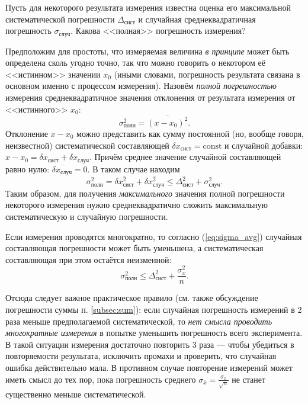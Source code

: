 \documentclass[10pt]{article}
\begin{document}
Пусть для некоторого результата измерения известна оценка его максимальной
систематической погрешности $\Delta_{\text{сист}}$ и случайная среднеквадратичная
погрешность $\sigma_{\text{случ}}$. Какова <<полная>>
погрешность измерения?

Предположим для простоты, что измеряемая величина \emph{в принципе}
может быть определена сколь угодно точно, так что можно говорить о
некотором её <<истинном>> значении $x_{0}$
(иными словами, погрешность результата связана в основном именно с
процессом измерения). Назовём \emph{полной погрешностью} измерения
среднеквадратичное значения отклонения от результата измерения от
<<истинного>> $x_{0}$: 
\[
\sigma_{\text{полн}}^{2}=\overline{\left(x-x_{0}\right)^{2}}.
\]
Отклонение $x-x_{0}$ можно представить как сумму постоянной (но,
вообще говоря, неизвестной) систематической составляющей $\delta x_{\text{сист}}=\mathrm{const}$
и случайной добавки: $x-x_{0}=\delta x_{\text{сист}}+\delta x_{\text{случ}}$.
Причём среднее значение случайной составляющей равно нулю: $\overline{\delta x_{\text{случ}}}=0$.
В таком случае находим
\begin{equation}
\sigma_{\text{полн}}^{2}=\overline{\delta x_{\text{сист}}^{2}}+\overline{\delta x_{\text{случ}}^{2}}\le\Delta_{\text{сист}}^{2}+\sigma_{\text{случ}}^{2}.\label{eq:syst_full}
\end{equation}
Таким образом, для получения \emph{максимального} значения полной
погрешности некоторого измерения нужно среднеквадратично сложить максимальную
систематическую и случайную погрешности.

Если измерения проводятся многократно, то согласно (\ref{eq:sigma_avg})
случайная составляющая погрешности может быть уменьшена, а систематическая
составляющая при этом остаётся неизменной:
\[
\sigma_{\text{полн}}^{2}\le\Delta_{\text{сист}}^{2}+\frac{\sigma_{x}^{2}}{n}.
\]

Отсюда следует важное практическое правило (см. также обсуждение погрешности
суммы п. \ref{subsec:sum}): если случайная погрешность измерений
в 2 раза меньше предполагаемой систематической, то \emph{нет
смысла проводить многократные измерения} в попытке уменьшить погрешность
всего эксперимента. В такой ситуации измерения достаточно повторить
3 раза --- чтобы убедиться в повторяемости
результата, исключить промахи и проверить, что случайная ошибка действительно
мала. В противном случае повторение измерений может иметь смысл до
тех пор, пока погрешность среднего $\sigma_{\overline{x}}=\frac{\sigma_{x}}{\sqrt{n}}$
не станет существенно меньше систематической.
\end{document}
